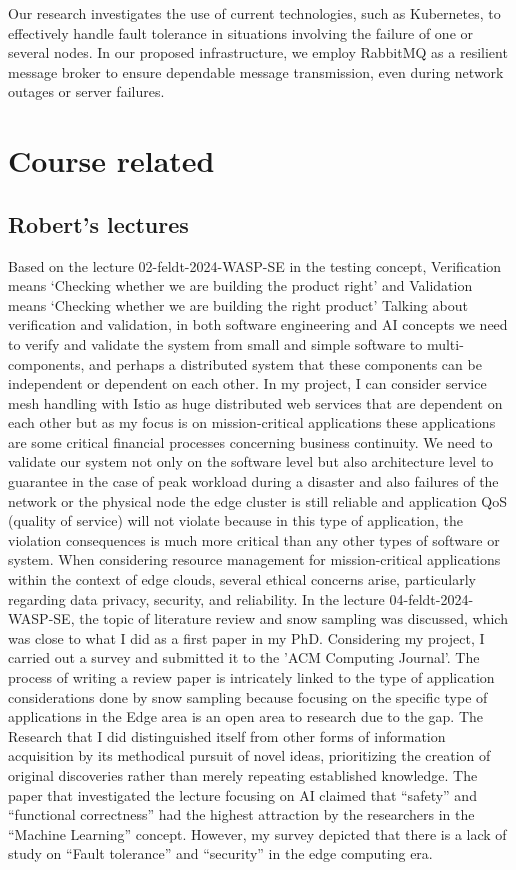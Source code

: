 \documentclass{article}
\begin{document}
Our research investigates the use of current technologies, such as Kubernetes, to effectively handle fault tolerance in situations involving the failure of one or several nodes. In our proposed infrastructure, we employ RabbitMQ as a resilient message broker to ensure dependable message transmission, even during network outages or server failures.

\section{Course related}
\subsection{Robert's lectures}
Based on the lecture 02-feldt-2024-WASP-SE in the testing concept, Verification means `Checking whether we are building the product right' and Validation means `Checking whether we are building the right product' Talking about verification and validation, in both software engineering and AI concepts we need to verify and validate the system from small and simple software to multi-components, and perhaps a distributed system that these components can be independent or dependent on each other. In my project, I can consider service mesh handling with Istio as huge distributed web services that are dependent on each other but as my focus is on mission-critical applications these applications are some critical financial processes concerning business continuity. We need to validate our system not only on the software level but also architecture level to guarantee in the case of peak workload during a disaster and also failures of the network or the physical node the edge cluster is still reliable and application QoS (quality of service) will not violate because in this type of application, the violation consequences is much more critical than any other types of software or system. 
When considering resource management for mission-critical applications within the context of edge clouds, several ethical concerns arise, particularly regarding data privacy, security, and reliability.
In the lecture 04-feldt-2024-WASP-SE, the topic of literature review and snow sampling was discussed, which was close to what I did as a first paper in my PhD. Considering my project, I carried out a survey and submitted it to the 'ACM Computing Journal'. The process of writing a review paper is intricately linked to the type of application considerations done by snow sampling because focusing on the specific type of applications in the Edge area is an open area to research due to the gap. The Research that I did distinguished itself from other forms of information acquisition by its methodical pursuit of novel ideas, prioritizing the creation of original discoveries rather than merely repeating established knowledge. The paper that investigated the lecture focusing on AI claimed that ``safety'' and ``functional correctness'' had the highest attraction by the researchers in the ``Machine Learning'' concept. However, my survey depicted that there is a lack of study on ``Fault tolerance'' and ``security'' in the edge computing era. 
\end{document}
